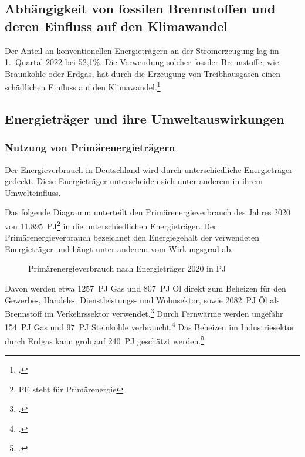 \documentclass[12pt, ngerman]{article}
\newcommand{\pe}{_{\mathrm{PE}}}
\begin{document}
\subsection{Abhängigkeit von fossilen Brennstoffen und deren Einfluss auf den Klimawandel}

Der Anteil an konventionellen Energieträgern an der Stromerzeugung lag im 1.\ Quartal 2022 bei 52,1\%.
Die Verwendung solcher fossiler Brennstoffe, wie Braunkohle oder Erdgas, hat durch die Erzeugung von
Treibhausgasen einen schädlichen Einfluss auf den Klimawandel.\footcite{wilkeErneuerbareUndKonventionelle2013}

\subsection{Energieträger und ihre Umweltauswirkungen}

\subsubsection{Nutzung von Primärenergieträgern}\label{subsec:primar}

Der Energieverbrauch in Deutschland wird durch unterschiedliche Energieträger gedeckt.
Diese Energieträger unterscheiden sich unter anderem in ihrem Umwelteinfluss.

Das folgende Diagramm unterteilt den Primärenergieverbrauch des Jahres 2020 von
\qty{11.895}{PJ\pe}\footnote{PE steht für Primärenergie}
in die unterschiedlichen Energieträger.
Der Primärenergieverbrauch bezeichnet den Energiegehalt der verwendeten Energieträger und
hängt unter anderem vom Wirkungsgrad ab.

\begin{figure}[!h]
    \caption{Primärenergieverbrauch nach Energieträger 2020 in
        \unit{PJ\pe}}
\end{figure}


Davon werden etwa \qty{1257}{PJ\pe} Gas und \qty{807}{PJ\pe} Öl direkt zum Beheizen für den Gewerbe-, Handels-,
Dienstleistungs- und Wohnsektor, sowie \qty{2082}{PJ\pe} Öl als Brennstoff im Verkehrssektor verwendet.\footcite{Energieflussbild2020PJLang}
Durch Fernwärme werden ungefähr \qty{154}{PJ\pe} Gas und \qty{97}{PJ\pe} Steinkohle verbraucht.\footcite{WieKannTransformation}
Das Beheizen im Industriesektor durch Erdgas kann grob auf \qty{240}{PJ\pe} geschätzt werden.\footcite{Industrie}
\end{document}
